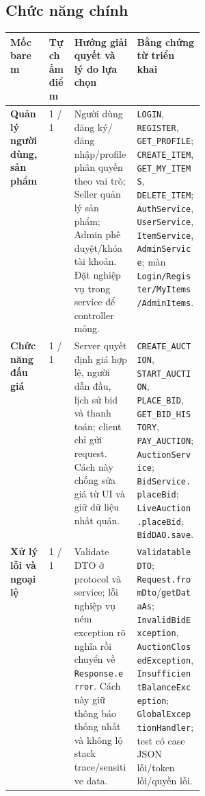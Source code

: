 \documentclass[10pt,a4paper]{article}
\begin{document}
\subsection*{Chức năng chính}
{\scriptsize
\setlength{\tabcolsep}{3pt}
\noindent
\begin{tabularx}{\linewidth}{>{\raggedright\arraybackslash\bfseries}p{0.20\linewidth} p{0.13\linewidth} Y Y}
\toprule
Mốc barem & Tự chấm điểm & Hướng giải quyết và lý do lựa chọn & Bằng chứng từ triển khai \\
\midrule
Quản lý người dùng, sản phẩm & 1 / 1 & Người dùng đăng ký/đăng nhập/profile phân quyền theo vai trò; Seller quản lý sản phẩm; Admin phê duyệt/khóa tài khoản. Đặt nghiệp vụ trong service để controller mỏng. & \texttt{LOGIN}, \texttt{REGISTER}, \texttt{GET\_PROFILE}; \texttt{CREATE\_ITEM}, \texttt{GET\_MY\_ITEMS}, \texttt{DELETE\_ITEM}; \texttt{AuthService}, \texttt{UserService}, \texttt{ItemService}, \texttt{AdminService}; màn \texttt{Login/Register/MyItems/AdminItems}. \\
\addlinespace
Chức năng đấu giá & 1 / 1 & Server quyết định giá hợp lệ, người dẫn đầu, lịch sử bid và thanh toán; client chỉ gửi request. Cách này chống sửa giá từ UI và giữ dữ liệu nhất quán. & \texttt{CREATE\_AUCTION}, \texttt{START\_AUCTION}, \texttt{PLACE\_BID}, \texttt{GET\_BID\_HISTORY}, \texttt{PAY\_AUCTION}; \texttt{AuctionService}; \texttt{BidService.placeBid}; \texttt{LiveAuction.placeBid}; \texttt{BidDAO.save}. \\
\addlinespace
Xử lý lỗi và ngoại lệ & 1 / 1 & Validate DTO ở protocol và service; lỗi nghiệp vụ ném exception rõ nghĩa rồi chuyển về \texttt{Response.error}. Cách này giữ thông báo thống nhất và không lộ stack trace/sensitive data. & \texttt{ValidatableDTO}; \texttt{Request.fromDto}/\texttt{getDataAs}; \texttt{InvalidBidException}, \texttt{AuctionClosedException}, \texttt{InsufficientBalanceException}; \texttt{GlobalExceptionHandler}; test có case JSON lỗi/token lỗi/quyền lỗi. \\
\bottomrule
\end{tabularx}\par}
\end{document}
